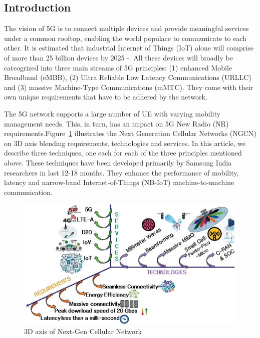 \begin{multicols}{2}

\section{Introduction}
 
The vision of 5G is to connect multiple devices and provide meaningful services under a common rooftop, enabling the world populace to communicate to each other. It is estimated that industrial Internet of Things (IoT) alone will comprise of more than 25 billion devices by 2025 \cite{art1-key01}-\cite{art1-key02}. All these devices will broadly be cateogrized into three main streams of 5G principles: (1) enhanced Mobile Broadband (eMBB), (2) Ultra Reliable Low Latency Communications (URLLC) and (3) massive Machine-Type Communications (mMTC). They come with their own unique requirements that have to be adhered by the network.

The 5G network supports a large number of UE with varying mobility management needs. This, in turn, has an impact on 5G New Radio (NR) requirements.\break Figure~\ref{chap1-fig01} illustrates the Next Generation Cellular Networks (NGCN) on 3D axis blending requirements, technologies and services. In this article, we describe three techniques, one each for each of the three principles mentioned above. These techniques have been developed primarily by Samsung India researchers in last 12-18 months. They enhance the performance of mobility, latency and narrow-band Internet-of-Things (NB-IoT) machine-to-machine communication. 

\setcounter{figure}{0}
\begin{figure}[H]
\centering
\includegraphics[scale=1.3]{src/Figures/chap1/chap1-fig01.jpg}
\caption{3D axis of Next-Gen Cellular Network}\label{chap1-fig01}
\end{figure}


\end{multicols}
